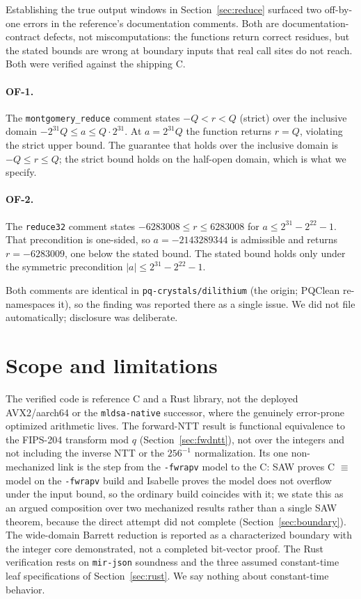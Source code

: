 \documentclass[11pt]{article}
\newcommand{\code}[1]{\texttt{#1}}
\begin{document}
Establishing the true output windows in Section~\ref{sec:reduce} surfaced two off-by-one errors in the
reference's documentation comments. Both are documentation-contract defects, not miscomputations: the
functions return correct residues, but the stated bounds are wrong at boundary inputs that real call
sites do not reach. Both were verified against the shipping C.

\paragraph{OF-1.} The \code{montgomery\_reduce} comment states $-Q < r < Q$ (strict) over the inclusive
domain $-2^{31} Q \le a \le Q \cdot 2^{31}$. At $a = 2^{31} Q$ the function returns $r = Q$, violating the
strict upper bound. The guarantee that holds over the inclusive domain is $-Q \le r \le Q$; the strict
bound holds on the half-open domain, which is what we specify.

\paragraph{OF-2.} The \code{reduce32} comment states $-6283008 \le r \le 6283008$ for $a \le 2^{31} -
2^{22} - 1$. That precondition is one-sided, so $a = -2143289344$ is admissible and returns $r =
-6283009$, one below the stated bound. The stated bound holds only under the symmetric precondition
$|a| \le 2^{31} - 2^{22} - 1$.

Both comments are identical in \code{pq-crystals/dilithium} (the origin; PQClean re-namespaces it), so
the finding was reported there as a single issue. We did not file automatically; disclosure was
deliberate.

\section{Scope and limitations}\label{sec:scope}

The verified code is reference C and a Rust library, not the deployed AVX2/aarch64 or the
\code{mldsa-native} successor, where the genuinely error-prone optimized arithmetic lives. The
forward-NTT result is functional equivalence to the FIPS-204 transform mod $q$ (Section~\ref{sec:fwdntt}),
not over the integers and not including the inverse NTT or the $256^{-1}$ normalization. Its one
non-mechanized link is the step from the \code{-fwrapv} model to the C: SAW proves C $\equiv$ model on the
\code{-fwrapv} build and Isabelle proves the model does not overflow under the input bound, so the
ordinary build coincides with it; we state this as an argued composition over two mechanized results
rather than a single SAW theorem, because the direct attempt did not complete (Section~\ref{sec:boundary}).
The wide-domain Barrett reduction is reported as a characterized boundary with the integer core
demonstrated, not a completed bit-vector proof. The Rust verification rests on \code{mir-json} soundness
and the three assumed constant-time leaf specifications of Section~\ref{sec:rust}. We say nothing about
constant-time behavior.
\end{document}
